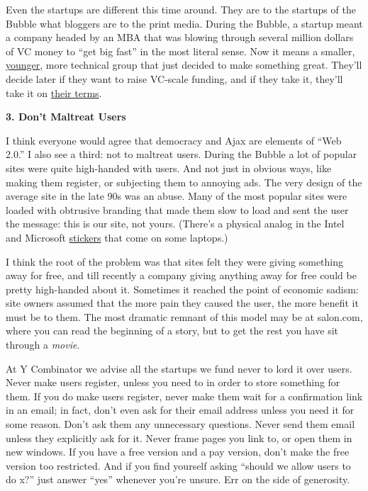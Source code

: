 Even the startups are different this time around. They are to the
startups of the Bubble what bloggers are to the print media. During the
Bubble, a startup meant a company headed by an MBA that was blowing
through several million dollars of VC money to ``get big fast'' in the
most literal sense. Now it means a smaller, \href{hiring.html}{younger},
more technical group that just decided to make something great. They'll
decide later if they want to raise VC-scale funding, and if they take
it, they'll take it on \href{vcsqueeze.html}{their terms}.

\textbf{3. Don't Maltreat Users}

I think everyone would agree that democracy and Ajax are elements of
``Web 2.0.'' I also see a third: not to maltreat users. During the
Bubble a lot of popular sites were quite high-handed with users. And not
just in obvious ways, like making them register, or subjecting them to
annoying ads. The very design of the average site in the late 90s was an
abuse. Many of the most popular sites were loaded with obtrusive
branding that made them slow to load and sent the user the message: this
is our site, not yours. (There's a physical analog in the Intel and
Microsoft \href{designedforwindows.html}{stickers} that come on some
laptops.)

I think the root of the problem was that sites felt they were giving
something away for free, and till recently a company giving anything
away for free could be pretty high-handed about it. Sometimes it reached
the point of economic sadism: site owners assumed that the more pain
they caused the user, the more benefit it must be to them. The most
dramatic remnant of this model may be at salon.com, where you can read
the beginning of a story, but to get the rest you have sit through a
\emph{movie}.

At Y Combinator we advise all the startups we fund never to lord it over
users. Never make users register, unless you need to in order to store
something for them. If you do make users register, never make them wait
for a confirmation link in an email; in fact, don't even ask for their
email address unless you need it for some reason. Don't ask them any
unnecessary questions. Never send them email unless they explicitly ask
for it. Never frame pages you link to, or open them in new windows. If
you have a free version and a pay version, don't make the free version
too restricted. And if you find yourself asking ``should we allow users
to do x?'' just answer ``yes'' whenever you're unsure. Err on the side
of generosity.

